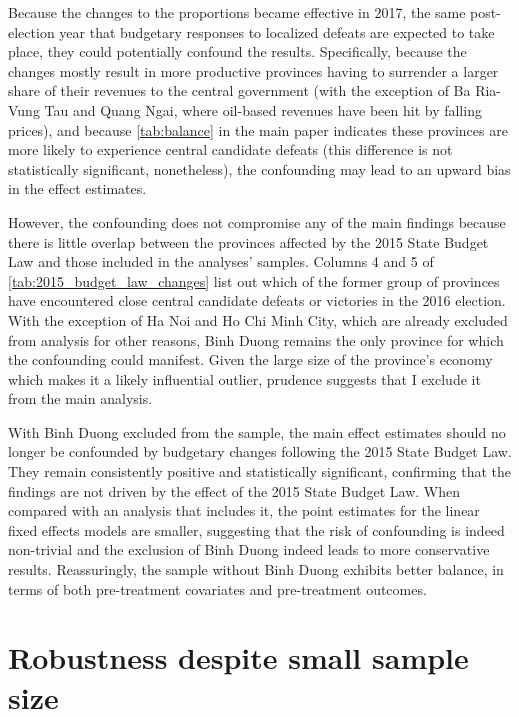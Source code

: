 \documentclass[12pt]{article}
\newcommand{\1}{\mathbbm{1}}
\begin{document}
Because the changes to the proportions became effective in 2017, the same post-election year that budgetary responses to localized defeats are expected to take place, they could potentially confound the results. Specifically, because the changes mostly result in more productive provinces having to surrender a larger share of their revenues to the central government (with the exception of Ba Ria-Vung Tau and Quang Ngai, where oil-based revenues have been hit by falling prices), and because \autoref{tab:balance} in the main paper indicates these provinces are more likely to experience central candidate defeats (this difference is not statistically significant, nonetheless), the confounding may lead to an upward bias in the effect estimates.

However, the confounding does not compromise any of the main findings because there is little overlap between the provinces affected by the 2015 State Budget Law and those included in the analyses' samples. Columns 4 and 5 of \autoref{tab:2015_budget_law_changes} list out which of the former group of provinces have encountered close central candidate defeats or victories in the 2016 election. With the exception of Ha Noi and Ho Chi Minh City, which are already excluded from analysis for other reasons, Binh Duong remains the only province for which the confounding could manifest. Given the large size of the province's economy which makes it a likely influential outlier, prudence suggests that I exclude it from the main analysis.

With Binh Duong excluded from the sample, the main effect estimates should no longer be confounded by budgetary changes following the 2015 State Budget Law. They remain consistently positive and statistically significant, confirming that the findings are not driven by the effect of the 2015 State Budget Law. When compared with an analysis that includes it, the point estimates for the linear fixed effects models are smaller, suggesting that the risk of confounding is indeed non-trivial and the exclusion of Binh Duong indeed leads to more conservative results. Reassuringly, the sample without Binh Duong exhibits better balance, in terms of both pre-treatment covariates and pre-treatment outcomes.

\clearpage

\section{Robustness despite small sample size}
\label{app:small_sample}
\end{document}
